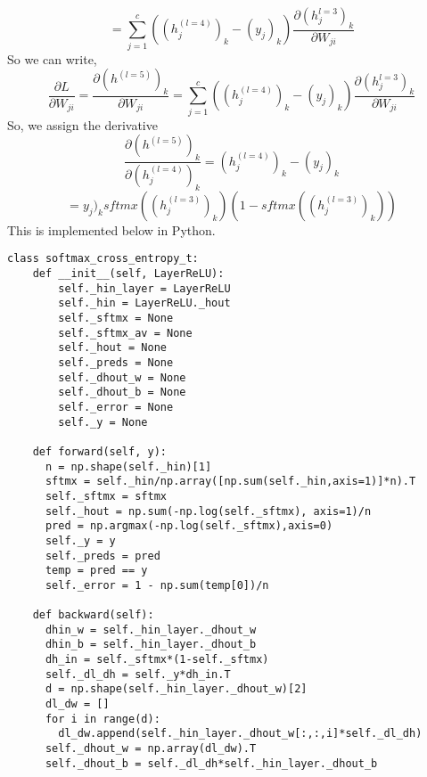 \documentclass[12pt]{article}
\begin{document}
$$ =  \sum_{j=1}^{c}  ((h^{(l=4)}_{j})_{k}  -   (y_{j})_{k}   ) \frac{\partial (h^{l=3}_{j})_{k}  }{ \partial W_{ji} }   $$ 
So we can write, 
$$ \frac{\partial  L }{\partial  W_{ji} }  =  \frac{\partial  (h^{(l=5)})_{k}}{\partial  W_{ji}}  = \sum_{j=1}^{c}  ((h^{(l=4)}_{j})_{k}  -   (y_{j})_{k}   ) \frac{\partial (h^{l=3}_{j})_{k}  }{ \partial W_{ji} }    $$
So, we assign the derivative 
$$   \frac{\partial  (h^{(l=5)})_{k} }{\partial (h_{j} ^{(l=4)})_{k}  } =  (h^{(l=4)}_{j})_{k}  -   (y_{j})_{k}     $$
$$ = y_{j})_{k} sftmx((h^{(l=3)}_{j})_{k} )(1 -  sftmx((h^{(l=3)}_{j})_{k} ) )   $$ 
This is implemented below in Python. 

\begin{lstlisting}
class softmax_cross_entropy_t:
    def __init__(self, LayerReLU):
        self._hin_layer = LayerReLU
        self._hin = LayerReLU._hout 
        self._sftmx = None 
        self._sftmx_av = None 
        self._hout = None 
        self._preds = None 
        self._dhout_w = None       
        self._dhout_b = None 
        self._error = None
        self._y = None 
    
    def forward(self, y):
      n = np.shape(self._hin)[1]   
      sftmx = self._hin/np.array([np.sum(self._hin,axis=1)]*n).T
      self._sftmx = sftmx  
      self._hout = np.sum(-np.log(self._sftmx), axis=1)/n 
      pred = np.argmax(-np.log(self._sftmx),axis=0)
      self._y = y 
      self._preds = pred 
      temp = pred == y 
      self._error = 1 - np.sum(temp[0])/n
      
    def backward(self):
      dhin_w = self._hin_layer._dhout_w
      dhin_b = self._hin_layer._dhout_b 
      dh_in = self._sftmx*(1-self._sftmx)  
      self._dl_dh = self._y*dh_in.T
      d = np.shape(self._hin_layer._dhout_w)[2]
      dl_dw = [] 
      for i in range(d): 
        dl_dw.append(self._hin_layer._dhout_w[:,:,i]*self._dl_dh)
      self._dhout_w = np.array(dl_dw).T
      self._dhout_b = self._dl_dh*self._hin_layer._dhout_b 
\end{lstlisting} 
\end{document}
